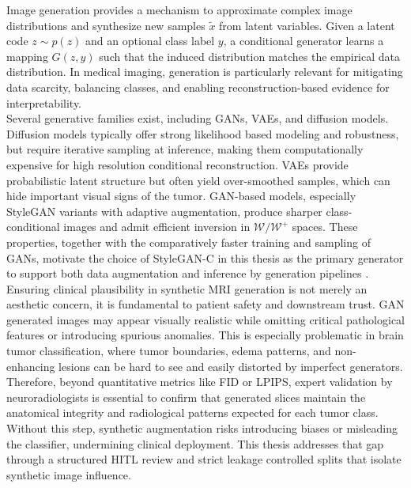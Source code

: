 Image generation provides a mechanism to approximate complex image distributions and synthesize new samples $\tilde{x}$ from latent variables. Given a latent code $z\sim p(z)$ and an optional class label $y$, a conditional generator learns a mapping $G(z,y)$ such that the induced distribution matches the empirical data distribution. In medical imaging, generation is particularly relevant for mitigating data scarcity, balancing classes, and enabling reconstruction-based evidence for interpretability.\\

Several generative families exist, including GANs, VAEs, and diffusion models. Diffusion models typically offer strong likelihood based modeling and robustness, but require iterative sampling at inference, making them computationally expensive for high resolution conditional reconstruction. VAEs provide probabilistic latent structure but often yield over-smoothed samples, which can hide important visual signs of the tumor. GAN-based models, especially StyleGAN variants with adaptive augmentation, produce sharper class-conditional images and admit efficient inversion in $\mathcal{W}/\mathcal{W}^+$ spaces. These properties, together with the comparatively faster training and sampling of GANs, motivate the choice of StyleGAN-C in this thesis as the primary generator to support both data augmentation and inference by generation pipelines \cite{abdullah2025computationallyefficientdiffusionmodels}.
\\

Ensuring clinical plausibility in synthetic MRI generation is not merely an aesthetic concern, it is fundamental to patient safety and downstream trust. GAN generated images may appear visually realistic while omitting critical pathological features or introducing spurious anomalies. This is especially problematic in brain tumor classification, where tumor boundaries, edema patterns, and non-enhancing lesions can be hard to see and easily distorted by imperfect generators. Therefore, beyond quantitative metrics like FID or LPIPS, expert validation by neuroradiologists is essential to confirm that generated slices maintain the anatomical integrity and radiological patterns expected for each tumor class. Without this step, synthetic augmentation risks introducing biases or misleading the classifier, undermining clinical deployment. This thesis addresses that gap through a structured HITL review and strict leakage controlled splits that isolate synthetic image influence.



